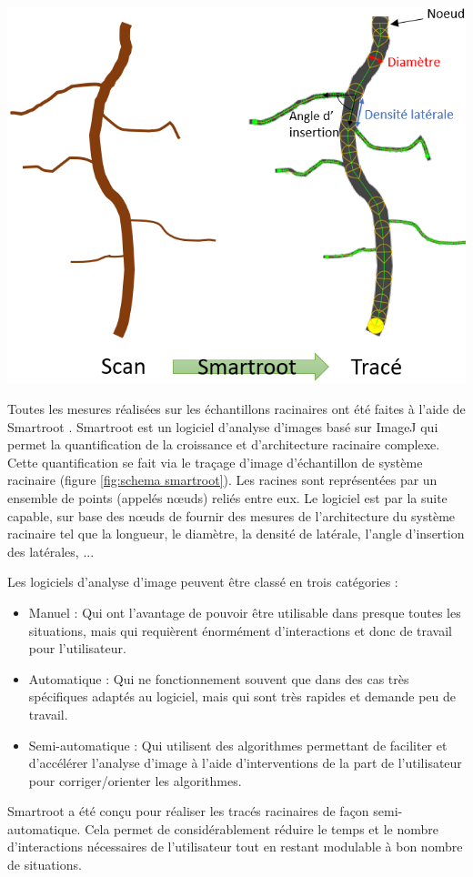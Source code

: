 \begin{minipage}{0.5\linewidth}
\captionsetup{type=figure,hypcap=true}
\centering
\includegraphics[width=1\linewidth]{Image/schema smartroot.png}
\label{fig:schema smartroot}
\end{minipage}\hfill
\begin{minipage}{0.45\linewidth}
Toutes les mesures réalisées sur les échantillons racinaires ont été faites à l'aide de Smartroot \citep{lobet_novel_2011}.
Smartroot est un logiciel d'analyse d'images basé sur ImageJ qui permet la quantification de la croissance et d'architecture racinaire complexe.
Cette quantification se fait via le traçage d'image d'échantillon de système racinaire (figure \ref{fig:schema smartroot}).
Les racines sont représentées par un ensemble de points (appelés nœuds) reliés entre eux.
Le logiciel est par la suite capable, sur base des nœuds de fournir des mesures de l'architecture du système racinaire tel que la longueur, le diamètre, la densité de latérale, l'angle d'insertion des latérales, ...
\end{minipage} 
\newline

\noindent Les logiciels d'analyse d'image peuvent être classé en trois catégories :
\begin{itemize}
    \item Manuel : Qui ont l'avantage de pouvoir être utilisable dans presque toutes les situations, mais qui requièrent énormément d'interactions et donc de travail pour l'utilisateur.
    \item Automatique : Qui ne fonctionnement souvent que dans des cas très spécifiques adaptés au logiciel, mais qui sont très rapides et demande peu de travail.
    \item Semi-automatique : Qui utilisent des algorithmes permettant de faciliter et d'accélérer l'analyse d'image à l'aide d'interventions de la part de l'utilisateur pour corriger/orienter les algorithmes.
\end{itemize}
Smartroot a été conçu pour réaliser les tracés racinaires de façon semi-automatique.
Cela permet de considérablement réduire le temps et le nombre d'interactions nécessaires de l'utilisateur tout en restant modulable à bon nombre de situations.

